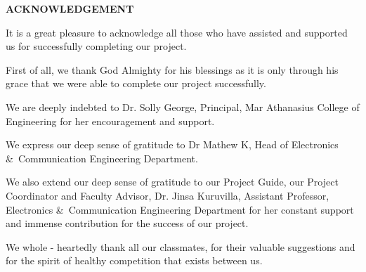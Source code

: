 \documentclass[12pt,a4paper]{report}
\begin{document}
\newpage
{}
\setcounter{page}{1}
\begin{verbatim}
\end{verbatim}
\begin{center}
\textbf {\large ACKNOWLEDGEMENT}
\end{center}
\vspace{0.4125in}
\par
It is a great pleasure to acknowledge all those who have assisted and supported us for successfully completing our project.
\\
\par 
First of all, we thank God Almighty for his blessings as it is only through his grace that we were able to complete our project successfully.
\\
\par 
We are deeply indebted to Dr. Solly George, Principal, Mar Athanasius College of Engineering for her encouragement and support.
\\
\par
We express our deep sense of gratitude to Dr Mathew K, Head of Electronics \&\  Communication Engineering Department.
\\
\par
We also extend our deep sense of gratitude to our Project Guide, our Project Coordinator and Faculty Advisor, Dr. Jinsa Kuruvilla, Assistant Professor, Electronics \&\  Communication Engineering Department for her constant support and immense contribution for the success of our project.
\\
\par
 We whole - heartedly thank all our classmates, for their valuable suggestions and for the spirit of healthy competition that exists between us. 
 
 
\end{document}
